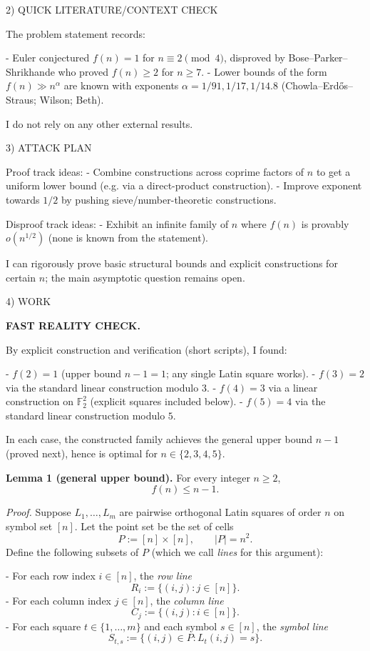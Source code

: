 2) QUICK LITERATURE/CONTEXT CHECK

The problem statement records:

- Euler conjectured $f(n)=1$ for $n\equiv 2\pmod 4$, disproved by Bose--Parker--Shrikhande who proved $f(n)\ge 2$ for $n\ge 7$.
- Lower bounds of the form $f(n)\gg n^\alpha$ are known with exponents $\alpha=1/91,1/17,1/14.8$ (Chowla--Erd\H{o}s--Straus; Wilson; Beth).

I do not rely on any other external results.

3) ATTACK PLAN

Proof track ideas:
- Combine constructions across coprime factors of $n$ to get a uniform lower bound (e.g. via a direct-product construction).
- Improve exponent towards $1/2$ by pushing sieve/number-theoretic constructions.

Disproof track ideas:
- Exhibit an infinite family of $n$ where $f(n)$ is provably $o(n^{1/2})$ (none is known from the statement).

I can rigorously prove basic structural bounds and explicit constructions for certain $n$; the main asymptotic question remains open.

4) WORK

\textbf{FAST REALITY CHECK.}

By explicit construction and verification (short scripts), I found:

- $f(2)=1$ (upper bound $n-1=1$; any single Latin square works).
- $f(3)=2$ via the standard linear construction modulo $3$.
- $f(4)=3$ via a linear construction on $\mathbb F_2^2$ (explicit squares included below).
- $f(5)=4$ via the standard linear construction modulo $5$.

In each case, the constructed family achieves the general upper bound $n-1$ (proved next), hence is optimal for $n\in\{2,3,4,5\}$.

\medskip

\textbf{Lemma 1 (general upper bound).}
For every integer $n\ge 2$,
\[
 f(n) \le n-1.
\]

\emph{Proof.}
Suppose $L_1,\dots,L_m$ are pairwise orthogonal Latin squares of order $n$ on symbol set $[n]$.
Let the point set be the set of cells
\[
P := [n]\times[n],\qquad |P|=n^2.
\]
Define the following subsets of $P$ (which we call \emph{lines} for this argument):

- For each row index $i\in[n]$, the \emph{row line}
  \[R_i := \{(i,j): j\in[n]\}.\]
- For each column index $j\in[n]$, the \emph{column line}
  \[C_j := \{(i,j): i\in[n]\}.\]
- For each square $t\in\{1,\dots,m\}$ and each symbol $s\in[n]$, the \emph{symbol line}
  \[S_{t,s} := \{(i,j)\in P: L_t(i,j)=s\}.\]

